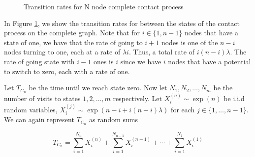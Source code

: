 \documentclass{article}
\theoremstyle{plain}
\theoremstyle{definition}
\theoremstyle{remark}
\numberwithin{equation}{section}
\begin{document}
\begin{figure}[h]
    \centering
    \caption{Transition rates for N node complete contact process}
    \label{fig:complete_contact_n_node_rates}
\end{figure}

In Figure \ref{fig:complete_contact_n_node_rates}, we show the transition rates for between the states of the contact process on the complete graph.
Note that for $i \in \{1, n - 1\} $ nodes that have a state of one, we have that the rate of going to $i + 1$ nodes is one of the $n - i$ nodes turning to one, each at a rate of $\lambda i$.
Thus, a total rate of $i (n - i) \lambda$.
The rate of going state with $i - 1$ ones is $i$ since we have $i$ nodes that have a potential to switch to zero, each with a rate of one.

Let $T_{C_n}$ be the time until we reach state zero.
Now let $N_1, N_2, \ldots, N_m$ be the number of visits to states $1, 2, \ldots, m$ respectively.
Let $X_i^{(n)} \sim \exp(n)$ be i.i.d random variables, $X_i^{(j)} \sim \exp(n - i + i(n - i)\lambda)$ for each $j \in \{1, \ldots, n-1\}$.
We can again represent $T_{C_n}$ as random sums

\begin{equation}\label{eq:wait_contact_sum}
    T_{C_n} = \sum_{i = 1}^{N_n} X_i^{(n)} + \sum_{i = 1}^{N_{n - 1}} X_i^{(n - 1)} + \cdots + \sum_{i = 1}^{N_1} X_i^{(1)}
\end{equation}
\end{document}
